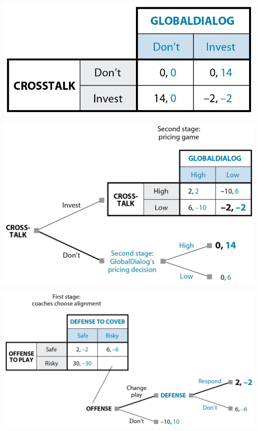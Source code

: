 \documentclass[10pt]{beamer}
\begin{document}
\begin{frame}[label={sec:orgf073e7b}]{}
\begin{center}
\includegraphics[width=.75\textwidth]{./img/GAMES4_FIG06.02.jpg}
\end{center}
\end{frame}
\begin{frame}[label={sec:orgf67990c}]{}
\begin{center}
\includegraphics[width=.75\textwidth]{./img/GAMES4_FIG06.03.jpg}
\end{center}
\end{frame}

\begin{frame}[label={sec:org72f783f}]{}
\begin{center}
\includegraphics[width=.75\textwidth]{./img/GAMES4_FIG06.04.jpg}
\end{center}
\end{frame}
\end{document}
